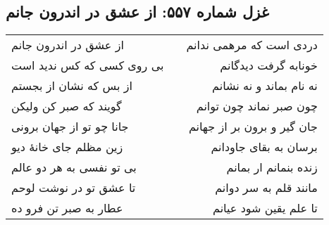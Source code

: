 \begin{center}
\section*{غزل شماره ۵۵۷: از عشق در اندرون جانم}
\label{sec:557}
\begin{longtable}{l p{0.5cm} r}
از عشق در اندرون جانم
&&
دردی است که مرهمی ندانم
\\
بی روی کسی که کس ندید است
&&
خونابه گرفت دیدگانم
\\
از بس که نشان از بجستم
&&
نه نام بماند و نه نشانم
\\
گویند که صبر کن ولیکن
&&
چون صبر نماند چون توانم
\\
جانا چو تو از جهان برونی
&&
جان گیر و برون بر از جهانم
\\
زین مظلم جای خانهٔ دیو
&&
برسان به بقای جاودانم
\\
بی تو نفسی به هر دو عالم
&&
زنده بنمانم ار بمانم
\\
تا عشق تو در نوشت لوحم
&&
مانند قلم به سر دوانم
\\
عطار به صبر تن فرو ده
&&
تا علم یقین شود عیانم
\\
\end{longtable}
\end{center}
